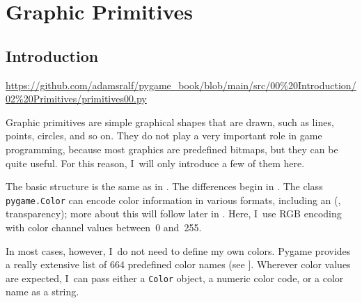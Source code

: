 \newpage
\section{Graphic Primitives}\label{secGrafikprimitive}
\subsection{Introduction}
\begin{diskbox}
	\url{https://github.com/adamsralf/pygame_book/blob/main/src/00%20Introduction/02%20Primitives/primitives00.py}
\end{diskbox}
Graphic primitives are simple graphical shapes that are drawn, such as lines, points, circles, and so on.
They do not play a very important role in game programming, because most graphics are predefined bitmaps, but they can be quite useful. For this reason, I~will only introduce a few of them here.


The basic structure is the same as in . The differences begin in . The class \texttt{pygame.Color} can encode color information in various formats, including an  (, transparency); more about this will follow later in
. Here, I~use RGB encoding with color channel values between~0 and~255.

In most cases, however, I~do not need to define my own colors. Pygame provides a really extensive list of 664 predefined color names  (see ]. Wherever color values are expected, I~can pass either a
\texttt{Color} object, a numeric color code, or a color name as a string.


